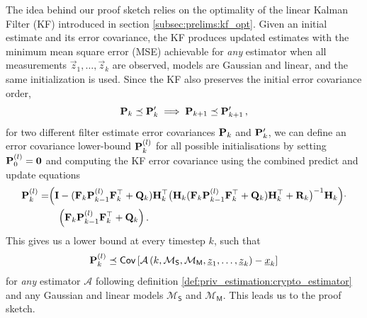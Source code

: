 The idea behind our proof sketch relies on the optimality of the linear Kalman Filter (KF) introduced in section \ref{subsec:prelims:kf_opt}. Given an initial estimate and its error covariance, the KF produces updated estimates with the minimum mean square error (MSE) achievable for \textit{any} estimator when all measurements $\vec{z}_1,\dots,\vec{z}_k$ are observed, models are Gaussian and linear, and the same initialization is used. Since the KF also preserves the initial error covariance order,
\begin{equation}
   {\ensuremath{{\mathbf{P}}}}_k \preceq {\ensuremath{{\mathbf{P}}}}_k^\prime \implies {\ensuremath{{\mathbf{P}}}}_{k+1} \preceq {\ensuremath{{\mathbf{P}}}}_{k+1}^\prime\,,
\end{equation}
for two different filter estimate error covariances ${{\mathbf{P}}}_k$ and ${{\mathbf{P}}}_k^\prime$, we can define an error covariance lower-bound ${{\mathbf{P}}}_k^{(l)}$ for all possible initialisations by setting ${{\mathbf{P}}}_0^{(l)} = {{\mathbf{0}}}$ and computing the KF error covariance using the combined predict and update equations
\begin{equation}\label{eq:priv_estimation:est_lower_bound_error_cov}
    \begin{split}
        {\ensuremath{{\mathbf{P}}}}_k^{(l)} =& \Bigl( {{\mathbf{I}}} - ({{\mathbf{F}}}_k{{\mathbf{P}}}_{k-1}^{(l)}{{\mathbf{F}}}_k^\top + {{\mathbf{Q}}}_k){{\mathbf{H}}}_k^\top \bigl({{\mathbf{H}}}_k({{\mathbf{F}}}_k{{\mathbf{P}}}_{k-1}^{(l)}{{\mathbf{F}}}_k^\top + {{\mathbf{Q}}}_k){{\mathbf{H}}}_k^\top + {{\mathbf{R}}}_k\bigr)^{-1}{{\mathbf{H}}}_k\Bigr)\cdot\\
        &\quad\Bigl({{\mathbf{F}}}_k{{\mathbf{P}}}_{k-1}^{(l)}{{\mathbf{F}}}_k^\top + {{\mathbf{Q}}}_k\Bigr)\,.
    \end{split}
\end{equation}
This gives us a lower bound at every timestep $k$, such that
\begin{equation}
    {\ensuremath{{\mathbf{P}}}}_k^{(l)} \preceq \mathsf{Cov}\left[\mathcal{A}\left(k, \mathcal{M}_{\mathsf{S}}, \mathcal{M}_{\mathsf{M}}, {\underline{z}}_1,\dots,{\underline{z}}_k\right) - {\underline{x}}_k \right]
\end{equation}
for \textit{any} estimator $\mathcal{A}$ following definition \ref{def:priv_estimation:crypto_estimator} and any Gaussian and linear models $\mathcal{M}_{\mathsf{S}}$ and $\mathcal{M}_{\mathsf{M}}$. This leads us to the proof sketch.

% 
% 


